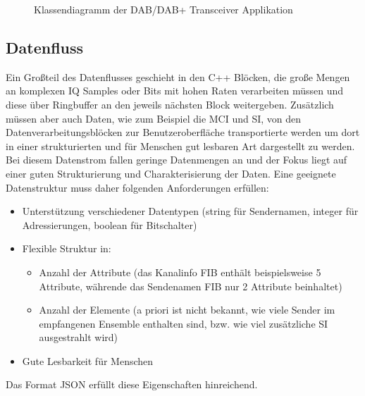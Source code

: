 \begin{figure}[h]
\begin{center}
\begin{tikzpicture}[node distance=1cm]
\end{tikzpicture}
\end{center}
\caption{Klassendiagramm der DAB/DAB+ Transceiver Applikation}
\end{figure}

\subsection{Datenfluss}
Ein Großteil des Datenflusses geschieht in den C++ Blöcken, die große Mengen an komplexen IQ Samples oder Bits mit hohen Raten verarbeiten müssen und diese über Ringbuffer an den jeweils nächsten Block weitergeben. Zusätzlich müssen aber auch Daten, wie zum Beispiel die MCI und SI, von den Datenverarbeitungsblöcken zur Benutzeroberfläche transportierte werden um dort in einer strukturierten und für Menschen gut lesbaren Art dargestellt zu werden. Bei diesem Datenstrom fallen geringe Datenmengen an und der Fokus liegt auf einer guten Strukturierung und Charakterisierung der Daten.
Eine geeignete Datenstruktur muss daher folgenden Anforderungen erfüllen:
\begin{itemize}
\item Unterstützung verschiedener Datentypen (string für Sendernamen, integer für Adressierungen, boolean für Bitschalter)
\item Flexible Struktur in:
\begin{itemize}
\item Anzahl der Attribute (das Kanalinfo FIB enthält beispielsweise 5 Attribute, währende das Sendenamen FIB nur 2 Attribute beinhaltet)
\item Anzahl der Elemente (a priori ist nicht bekannt, wie viele Sender im empfangenen Ensemble enthalten sind, bzw. wie viel zusätzliche SI ausgestrahlt wird)
\end{itemize}
\item Gute Lesbarkeit für Menschen
\end{itemize}
Das Format \ac{JSON} erfüllt diese Eigenschaften hinreichend.
